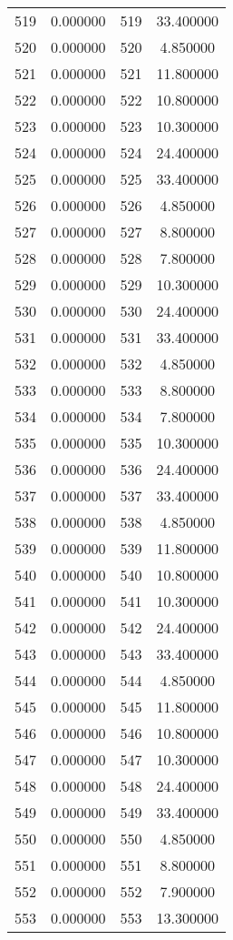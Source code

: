 \documentclass[12pt]{article}
\begin{document}
\begin{longtable}{@{}cccc@{}}
519 & 0.000000 & 519 & 33.400000 \\
520 & 0.000000 & 520 & 4.850000 \\
521 & 0.000000 & 521 & 11.800000 \\
522 & 0.000000 & 522 & 10.800000 \\
523 & 0.000000 & 523 & 10.300000 \\
524 & 0.000000 & 524 & 24.400000 \\
525 & 0.000000 & 525 & 33.400000 \\
526 & 0.000000 & 526 & 4.850000 \\
527 & 0.000000 & 527 & 8.800000 \\
528 & 0.000000 & 528 & 7.800000 \\
529 & 0.000000 & 529 & 10.300000 \\
530 & 0.000000 & 530 & 24.400000 \\
531 & 0.000000 & 531 & 33.400000 \\
532 & 0.000000 & 532 & 4.850000 \\
533 & 0.000000 & 533 & 8.800000 \\
534 & 0.000000 & 534 & 7.800000 \\
535 & 0.000000 & 535 & 10.300000 \\
536 & 0.000000 & 536 & 24.400000 \\
537 & 0.000000 & 537 & 33.400000 \\
538 & 0.000000 & 538 & 4.850000 \\
539 & 0.000000 & 539 & 11.800000 \\
540 & 0.000000 & 540 & 10.800000 \\
541 & 0.000000 & 541 & 10.300000 \\
542 & 0.000000 & 542 & 24.400000 \\
543 & 0.000000 & 543 & 33.400000 \\
544 & 0.000000 & 544 & 4.850000 \\
545 & 0.000000 & 545 & 11.800000 \\
546 & 0.000000 & 546 & 10.800000 \\
547 & 0.000000 & 547 & 10.300000 \\
548 & 0.000000 & 548 & 24.400000 \\
549 & 0.000000 & 549 & 33.400000 \\
550 & 0.000000 & 550 & 4.850000 \\
551 & 0.000000 & 551 & 8.800000 \\
552 & 0.000000 & 552 & 7.900000 \\
553 & 0.000000 & 553 & 13.300000 \\

\end{longtable}
\end{document}
